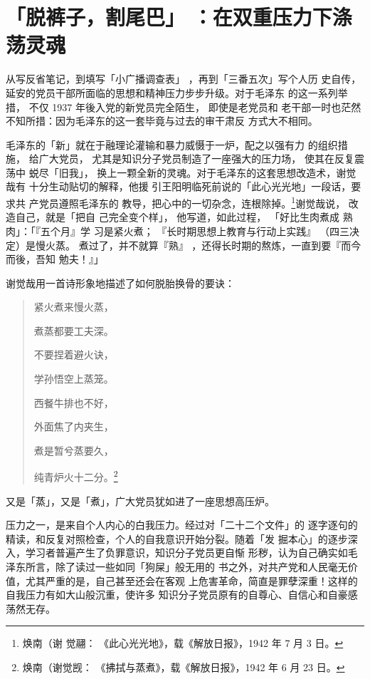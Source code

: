 \section{「脱裤子，割尾巴」
：在双重压力下涤荡灵魂}

从写反省笔记，到填写「小广播调查表」
，再到「三番五次」写个人历
史自传，延安的党员干部所面临的思想和精神压力步步升级。对于毛泽东
的这一系列举措，
不仅 1937 年後入党的新党员完全陌生，
即使是老党员和
老干部一时也茫然不知所措：因为毛泽东的这一套毕竟与过去的审干肃反
方式大不相同。

毛泽东的「新」就在于融理论灌输和暴力威慑于一炉，配之以强有力 的组织措施，
给广大党员， 尤其是知识分子党员制造了一座强大的压力场， 使其在反复震荡中
蜕尽「旧我」， 换上一颗全新的灵魂。对于毛泽东的这套思想改造术，谢觉哉有
十分生动贴切的解释，他援 引王阳明临死前说的「此心光光地」一段话，要求共
产党员遵照毛泽东的 教导，把心中的一切杂念，连根除掉。\footnote{焕南（谢
觉翮： 《此心光光地》，载《解放日报》，1942 年 7 月 3 日。}谢觉哉说，
改造自己，就是「把自 己完全变个样」， 他写道，如此过程， 「好比生肉煮成
熟肉」：「『五个月』学
习是紧火煮；
『长时期思想上教育与行动上实践』
（四三决定）是慢火蒸。
煮过了，并不就算『熟』
，还得长时期的熬炼，一直到要『而今而後，吾知
勉夫！』」

谢觉哉用一首诗形象地描述了如何脱胎换骨的要诀：
\begin{quote}
	\fzwkai 紧火煮来慢火蒸，

煮蒸都要工夫深。

不要捏着避火诀，

学孙悟空上蒸笼。

西餐牛排也不好，

外面焦了内夹生，

煮是暂兮蒸要久，

纯青炉火十二分。\footnote{焕南（谢觉觊：
《拂拭与蒸煮》，载《解放日报》，1942
 年 6 月 23 日。}
\end{quote}


又是「蒸」，又是「煮」，广大党员犹如进了一座思想高压炉。

压力之一，是来自个人内心的白我压力。经过对「二十二个文件」的
逐字逐句的精读，和反复对照检查，个人的自我意识开始分裂。随着「发
掘本心」的逐步深入，学习者普遍产生了负罪意识，知识分子党员更自惭
形秽，认为自己确实如毛泽东所言，除了读过一些如同「狗屎」般无用的
书之外，对共产党和人民毫无价值，尤其严重的是，自己甚至还会在客观
上危害革命，简直是罪孽深重！这样的自我压力有如大山般沉重，使许多
知识分子党员原有的自尊心、自信心和自豪感荡然无存。

